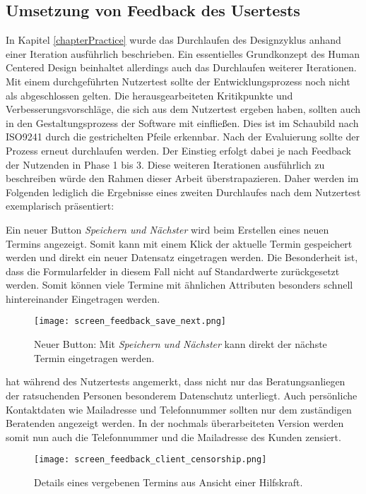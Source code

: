 \subsection{Umsetzung von Feedback des Usertests}
\label{paragraph:weitereIteration}

In Kapitel \ref{chapterPractice} wurde das Durchlaufen des Designzyklus anhand
einer Iteration ausführlich beschrieben. Ein essentielles Grundkonzept des
Human Centered Design beinhaltet allerdings auch das Durchlaufen weiterer
Iterationen. Mit einem durchgeführten Nutzertest sollte der Entwicklungsprozess
noch nicht als abgeschlossen gelten. Die herausgearbeiteten Kritikpunkte und
Verbesserungsvorschläge, die sich aus dem Nutzertest ergeben haben, sollten
auch in den Gestaltungsprozess der Software mit einfließen. Dies ist im
Schaubild nach ISO9241 durch die gestrichelten Pfeile erkennbar. Nach der
Evaluierung sollte der Prozess erneut durchlaufen werden. Der Einstieg erfolgt
dabei je nach Feedback der Nutzenden in Phase 1 bis 3\cite{iso9241}. Diese
weiteren Iterationen ausführlich zu beschreiben würde den Rahmen dieser Arbeit
überstrapazieren. Daher werden im Folgenden lediglich die Ergebnisse eines
zweiten Durchlaufes nach dem Nutzertest exemplarisch präsentiert:

Ein neuer Button \textit{Speichern und Nächster} wird beim Erstellen eines
neuen Termins angezeigt. Somit kann mit einem Klick der aktuelle Termin
gespeichert werden und direkt ein neuer Datensatz eingetragen werden. Die
Besonderheit ist, dass die Formularfelder in diesem Fall nicht auf
Standardwerte zurückgesetzt werden. Somit können viele Termine mit ähnlichen
Attributen besonders schnell hintereinander Eingetragen werden.

\begin{figure}[H]
    \caption{Neuer Button: Mit \textit{Speichern und Nächster} kann direkt der nächste Termin eingetragen werden.}
    \centering
    \texttt{[image: screen\_feedback\_save\_next.png]}
\end{figure}

\ipName hat während des Nutzertests angemerkt, dass nicht nur das Beratungsanliegen der ratsuchenden Personen besonderem Datenschutz unterliegt. Auch persönliche Kontaktdaten wie Mailadresse und Telefonnummer sollten nur dem zuständigen Beratenden angezeigt werden. In der nochmals überarbeiteten Version werden somit nun auch die Telefonnummer und die Mailadresse des Kunden zensiert.

\begin{figure}[H]
    \caption{Details eines vergebenen Termins aus Ansicht einer Hilfskraft.}
    \centering
    \texttt{[image: screen\_feedback\_client\_censorship.png]}
\end{figure}


